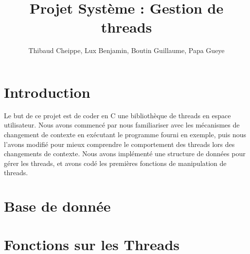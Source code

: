 \documentclass[a4paper,11pt]{report}
\title{Projet Système : Gestion de threads}
\author{Thibaud Cheippe, Lux Benjamin, Boutin Guillaume, Papa Gueye}
\begin{document}
\maketitle



\section*{Introduction}

Le but de ce projet est de coder en C une bibliothèque de threads en espace utilisateur. Nous avons commencé par nous familiariser avec les mécanismes de changement de contexte en exécutant le programme fourni en exemple, puis nous l'avons modifié pour mieux comprendre le comportement des threads lors des changements de contexte. Nous avons implémenté une structure de données pour gérer les threads, et avons codé les premières fonctions de manipulation de threads.

\section*{Base de donnée} 


\section*{Fonctions sur les Threads}

\end{document}
